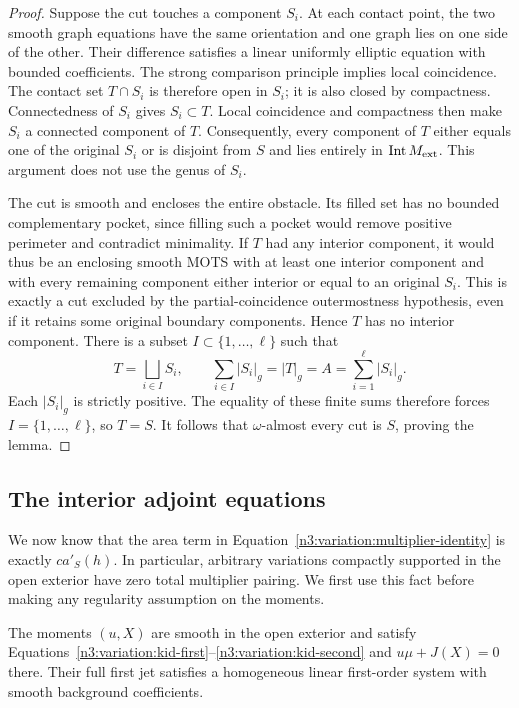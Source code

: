 \begin{proof}
Suppose the cut touches a component $S_i$.  At each contact point,
the two smooth graph equations have the same orientation and one graph
lies on one side of the other.  Their difference satisfies a linear
uniformly elliptic equation with bounded coefficients.  The strong
comparison principle implies local coincidence.  The contact set
$T\cap S_i$ is therefore open in $S_i$; it is also closed by compactness.
Connectedness of $S_i$ gives $S_i\subset T$.  Local coincidence and
compactness then make $S_i$ a connected component of $T$.  Consequently,
every component of $T$ either equals one of the original $S_i$ or is
disjoint from $S$ and lies entirely in $\operatorname{Int}M_{\mathrm{ext}}$.
This argument does not use the genus of $S_i$.

The cut is smooth and encloses the entire obstacle.  Its filled set
has no bounded complementary pocket, since filling such a pocket would
remove positive perimeter and contradict minimality.  If $T$ had any
interior component, it would thus be an enclosing smooth MOTS with at
least one interior component and with every remaining component either
interior or equal to an original $S_i$.  This is exactly a cut excluded
by the partial-coincidence outermostness hypothesis, even if it retains
some original boundary components.  Hence $T$ has no interior component.
There is a subset $I\subset\{1,\ldots,\ell\}$ such that
\[
 T=\bigsqcup_{i\in I}S_i,\qquad
 \sum_{i\in I}|S_i|_g=|T|_g=A
                       =\sum_{i=1}^{\ell}|S_i|_g.
\]
Each $|S_i|_g$ is strictly positive.  The equality of these finite sums
therefore forces $I=\{1,\ldots,\ell\}$, so $T=S$.
It follows that $\omega$-almost every cut is $S$, proving the lemma.
\end{proof}

\subsection{The interior adjoint equations}
\label{n3:variation:interior-subsection}

We now know that the area term in
Equation~\eqref{n3:variation:multiplier-identity} is exactly $c a'_S(h)$.
In particular, arbitrary variations compactly supported in the open
exterior have zero total multiplier pairing.  We first use this fact
before making any regularity assumption on the moments.

\begin{lemma}
\label{n3:variation:interior-equations}
The moments $(u,X)$ are smooth in the open exterior and satisfy
Equations~\eqref{n3:variation:kid-first}--\eqref{n3:variation:kid-second}
and $u\mu+J(X)=0$ there.  Their full first jet satisfies a homogeneous
linear first-order system with smooth background coefficients.
\end{lemma}

